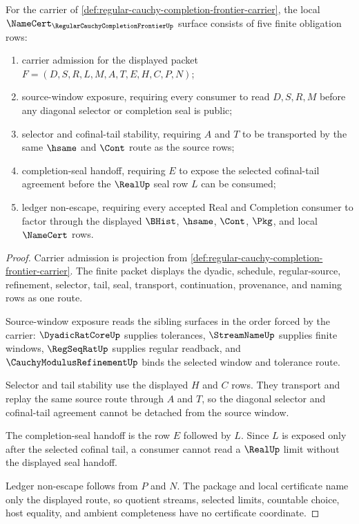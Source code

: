 \begin{theorem}
\label{thm:regular-cauchy-completion-frontier-namecert-obligations}
For the carrier of \autoref{def:regular-cauchy-completion-frontier-carrier}, the local $\NameCert_{\RegularCauchyCompletionFrontierUp}$ surface consists of five finite obligation rows:
\begin{enumerate}
\item carrier admission for the displayed packet $F=(D,S,R,L,M,A,T,E,H,C,P,N)$;
\item source-window exposure, requiring every consumer to read $D,S,R,M$ before any diagonal selector or completion seal is public;
\item selector and cofinal-tail stability, requiring $A$ and $T$ to be transported by the same $\hsame$ and $\Cont$ route as the source rows;
\item completion-seal handoff, requiring $E$ to expose the selected cofinal-tail agreement before the $\RealUp$ seal row $L$ can be consumed;
\item ledger non-escape, requiring every accepted Real and Completion consumer to factor through the displayed $\BHist$, $\hsame$, $\Cont$, $\Pkg$, and local $\NameCert$ rows.
\end{enumerate}
\end{theorem}
\begin{proof}
Carrier admission is projection from \autoref{def:regular-cauchy-completion-frontier-carrier}. The finite packet displays the dyadic, schedule, regular-source, refinement, selector, tail, seal, transport, continuation, provenance, and naming rows as one route.

Source-window exposure reads the sibling surfaces in the order forced by the carrier: $\DyadicRatCoreUp$ supplies tolerances, $\StreamNameUp$ supplies finite windows, $\RegSeqRatUp$ supplies regular readback, and $\CauchyModulusRefinementUp$ binds the selected window and tolerance route.

Selector and tail stability use the displayed $H$ and $C$ rows. They transport and replay the same source route through $A$ and $T$, so the diagonal selector and cofinal-tail agreement cannot be detached from the source window.

The completion-seal handoff is the row $E$ followed by $L$. Since $L$ is exposed only after the selected cofinal tail, a consumer cannot read a $\RealUp$ limit without the displayed seal handoff.

Ledger non-escape follows from $P$ and $N$. The package and local certificate name only the displayed route, so quotient streams, selected limits, countable choice, host equality, and ambient completeness have no certificate coordinate.
\end{proof}

